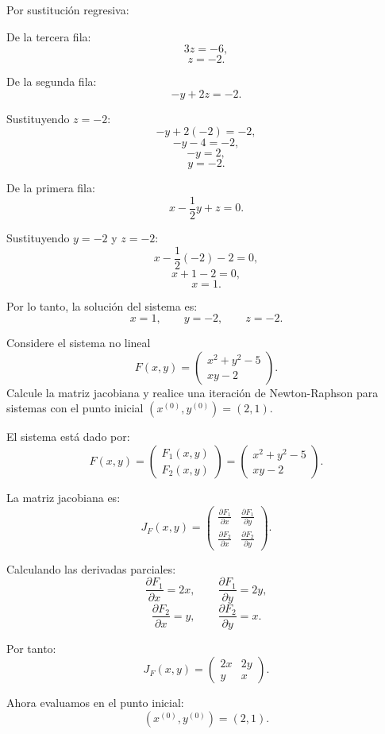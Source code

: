 \documentclass[11pt,respuestas,a4]{aleph-examen}
\begin{document}
\begin{preguntas}
\begin{respuesta}
Por sustitución regresiva:

De la tercera fila:
\[
3z=-6,
\]
\[
z=-2.
\]

De la segunda fila:
\[
-y+2z=-2.
\]

Sustituyendo $z=-2$:
\[
-y+2(-2)=-2,
\]
\[
-y-4=-2,
\]
\[
-y=2,
\]
\[
y=-2.
\]

De la primera fila:
\[
x-\frac{1}{2}y+z=0.
\]

Sustituyendo $y=-2$ y $z=-2$:
\[
x-\frac{1}{2}(-2)-2=0,
\]
\[
x+1-2=0,
\]
\[
x=1.
\]

Por lo tanto, la solución del sistema es:
\[
\boxed{x=1,\qquad y=-2,\qquad z=-2}.
\]
\end{respuesta}


\item
Considere el sistema no lineal 
\[
F(x,y)=
\begin{pmatrix}
x^2+y^2-5\\
xy-2
\end{pmatrix}.
\]
Calcule la matriz jacobiana y realice una iteración de Newton-Raphson para sistemas con el punto inicial $(x^{(0)},y^{(0)})=(2,1)$.

\begin{respuesta}
El sistema está dado por:
\[
F(x,y)=
\begin{pmatrix}
F_1(x,y)\\
F_2(x,y)
\end{pmatrix}
=
\begin{pmatrix}
x^2+y^2-5\\
xy-2
\end{pmatrix}.
\]

La matriz jacobiana es:
\[
J_F(x,y)=
\begin{pmatrix}
\frac{\partial F_1}{\partial x} & \frac{\partial F_1}{\partial y}\\
\frac{\partial F_2}{\partial x} & \frac{\partial F_2}{\partial y}
\end{pmatrix}.
\]

Calculando las derivadas parciales:
\[
\frac{\partial F_1}{\partial x}=2x,
\qquad
\frac{\partial F_1}{\partial y}=2y,
\]
\[
\frac{\partial F_2}{\partial x}=y,
\qquad
\frac{\partial F_2}{\partial y}=x.
\]

Por tanto:
\[
\boxed{
J_F(x,y)=
\begin{pmatrix}
2x & 2y\\
y & x
\end{pmatrix}
}.
\]

Ahora evaluamos en el punto inicial:
\[
(x^{(0)},y^{(0)})=(2,1).
\]


\end{respuesta}
\end{preguntas}
\end{document}
